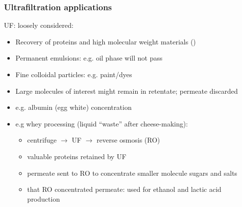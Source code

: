 \begin{frame}\frametitle{Ultrafiltration applications}
	UF: loosely considered: {\color{myGreen}{``cross-flow filtration at molecular level''}}
	\begin{itemize}
		\item	Recovery of proteins and high molecular weight materials ({\color{purple}{solute}})
		\item	Permanent emulsions: e.g. oil phase will not pass
		\item	Fine colloidal particles: e.g. paint/dyes
		\item	Large molecules of interest might remain in retentate; permeate discarded
		\item	e.g. albumin (egg white) concentration
		\item	e.g whey processing (liquid ``waste'' after cheese-making): %
		\begin{itemize}
			\item	centrifuge $\longrightarrow$ UF $\longrightarrow$ reverse osmosis (RO)
			\item	valuable proteins retained by UF
			\item	permeate sent to RO to concentrate smaller molecule sugars and salts
			\item	that RO concentrated permeate: used for ethanol and lactic acid production
		\end{itemize}
	\end{itemize}
\end{frame}

